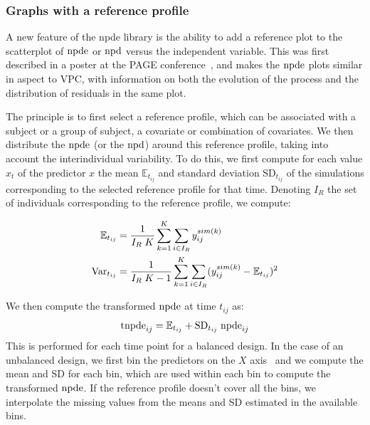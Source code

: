 \subsubsection{Graphs with a reference profile}

\hskip 18pt A new feature of the {\sf npde} library is the ability to add a reference plot to the scatterplot of 
${\rm npde}$ or ${\rm npd}$ versus the independent variable. This was first described in a poster at the PAGE 
conference~\cite{CometsPAGE13}, and makes the ${\rm npde}$ plots similar in aspect to VPC, with information on both the 
evolution of the process and the distribution of residuals in the same plot. 

The principle is to first select a reference profile, which can be associated with a subject or a group of subject, 
a covariate or combination of covariates. We then distribute the ${\rm npde}$ (or the ${\rm npd}$) around this reference 
profile, taking into account the interindividual variability. To do this, we first compute for each value $x_t$ of 
the predictor $x$ the mean $\mathbb{E}_{t_{ij}}$ and standard deviation SD$_{t_{ij}}$ of the simulations 
corresponding to the selected reference profile for that time. Denoting $I_R$ the set of individuals corresponding 
to the reference profile, we compute:

\begin{equation} 
\begin{split} 
\mathbb{E}_{t_{ij}} &= \frac{1}{I_R \; K} \sum_{k=1}^{K} \sum_{i \in I_R}  y_{ij}^{sim(k)} \\ 
{\rm Var}_{t_{ij}} &=  \frac{1}{I_R \; K -1}  \sum_{k=1}^{K} \sum_{i \in I_R}  (y_{ij}^{sim(k)} - \mathbb{E}_{t_{ij}})^2 \\ 
\end{split} 
\end{equation}

We then compute the transformed ${\rm npde}$ at time $t_{ij}$ as: \begin{equation} {\rm tnpde}_{ij} = \mathbb{E}_{t_{ij}} + 
{\rm SD}_{t_{ij}} \; {\rm npde}_{ij} \end{equation} This is performed for each time point for a balanced design. In the 
case of an unbalanced design, we first bin the predictors on the $X$ axis~\cite{Lavielle11} and we compute the mean 
and SD for each bin, which are used within each bin to compute the transformed ${\rm npde}$. If the reference profile 
doesn't cover all the bins, we interpolate the missing values from the means and SD estimated in the available 
bins. 

